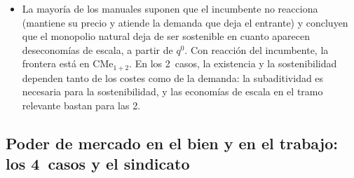\documentclass[11pt]{article}
\begin{document}
\begin{itemize}
\begin{itemize}
  \end{itemize}
\item La mayoría de los manuales suponen que el incumbente no reacciona (mantiene su precio y atiende la demanda que deja el entrante) y concluyen que el monopolio natural deja de ser sostenible en cuanto aparecen deseconomías de escala, a partir de $q^0$\nocite{BaumolPanzarWillig1982Contestable}. Con reacción del incumbente, la frontera está en $\mathrm{CMe}_{1+2}$\nocite{Segura1986Analisis}. En los 2~casos, la existencia y la sostenibilidad dependen tanto de los costes como de la demanda: la subaditividad es necesaria para la sostenibilidad, y las economías de escala en el tramo relevante bastan para las 2.
\end{itemize}

\subsection{Poder de mercado en el bien y en el trabajo: los 4~casos y el sindicato}\label{anexo:cuatro-casos}
\end{document}
